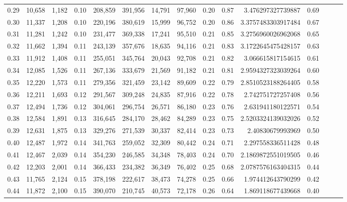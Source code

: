 \begin{tabular}{rrrrrrrrrrrrrrr}
0.29 &  10,658 &  1,182 &  0.10 &  208,859 &  391,956 &   14,791 &   97,960 &  0.20 &  0.87 &     3.476297327739887 &      0.69 \\
0.30 &  11,337 &  1,208 &  0.10 &  220,196 &  380,619 &   15,999 &   96,752 &  0.20 &  0.86 &    3.3757483303917484 &      0.67 \\
0.31 &  11,281 &  1,242 &  0.10 &  231,477 &  369,338 &   17,241 &   95,510 &  0.21 &  0.85 &    3.2756960026962068 &      0.65 \\
0.32 &  11,662 &  1,394 &  0.11 &  243,139 &  357,676 &   18,635 &   94,116 &  0.21 &  0.83 &    3.1722645475428157 &      0.63 \\
0.33 &  11,912 &  1,408 &  0.11 &  255,051 &  345,764 &   20,043 &   92,708 &  0.21 &  0.82 &     3.066615817154615 &      0.61 \\
0.34 &  12,085 &  1,526 &  0.11 &  267,136 &  333,679 &   21,569 &   91,182 &  0.21 &  0.81 &    2.9594327323039264 &      0.60 \\
0.35 &  12,220 &  1,573 &  0.11 &  279,356 &  321,459 &   23,142 &   89,609 &  0.22 &  0.79 &    2.8510523188264405 &      0.58 \\
0.36 &  12,211 &  1,693 &  0.12 &  291,567 &  309,248 &   24,835 &   87,916 &  0.22 &  0.78 &     2.742751727257408 &      0.56 \\
0.37 &  12,494 &  1,736 &  0.12 &  304,061 &  296,754 &   26,571 &   86,180 &  0.23 &  0.76 &     2.631941180122571 &      0.54 \\
0.38 &  12,584 &  1,891 &  0.13 &  316,645 &  284,170 &   28,462 &   84,289 &  0.23 &  0.75 &    2.5203324139032026 &      0.52 \\
0.39 &  12,631 &  1,875 &  0.13 &  329,276 &  271,539 &   30,337 &   82,414 &  0.23 &  0.73 &      2.40830679993969 &      0.50 \\
0.40 &  12,487 &  1,972 &  0.14 &  341,763 &  259,052 &   32,309 &   80,442 &  0.24 &  0.71 &     2.297558336511428 &      0.48 \\
0.41 &  12,467 &  2,039 &  0.14 &  354,230 &  246,585 &   34,348 &   78,403 &  0.24 &  0.70 &    2.1869872551019505 &      0.46 \\
0.42 &  12,203 &  2,001 &  0.14 &  366,433 &  234,382 &   36,349 &   76,402 &  0.25 &  0.68 &    2.0787576163404315 &      0.44 \\
0.43 &  11,765 &  2,124 &  0.15 &  378,198 &  222,617 &   38,473 &   74,278 &  0.25 &  0.66 &     1.974412643790299 &      0.42 \\
0.44 &  11,872 &  2,100 &  0.15 &  390,070 &  210,745 &   40,573 &   72,178 &  0.26 &  0.64 &     1.869118677439668 &      0.40 \\

\end{tabular}
